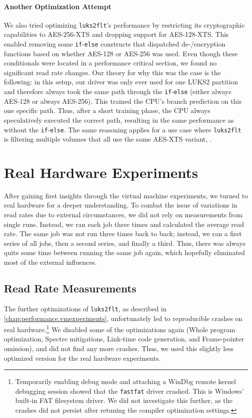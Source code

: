 \paragraph{Another Optimization Attempt}
We also tried optimizing \texttt{luks2flt}'s performance by restricting its cryptographic capabilities to AES-256-XTS and dropping support for AES-128-XTS. This enabled removing some \texttt{if}-\texttt{else} constructs that dispatched de-/encryption functions based on whether AES-128 or AES-256 was used. Even though these conditionals were located in a performance critical section, we found no significant read rate changes. Our theory for why this was the case is the following: in this setup, our driver was only ever used for one LUKS2 partition and therefore always took the same path through the \texttt{if}-\texttt{else} (either always AES-128 or always AES-256). This trained the CPU's branch prediction on this one specific path. Thus, after a short training phase, the CPU always speculatively executed the correct path, resulting in the same performance as without the \texttt{if}-\texttt{else}. The same reasoning applies for a use case where \texttt{luks2flt} is filtering multiple volumes that all use the same AES-XTS variant, .

\section{Real Hardware Experiments}
\label{chap:performance.hwexperiments}
After gaining first insights through the virtual machine experiments, we turned to real hardware for a deeper understanding. To combat the issue of variations in read rates due to external circumstances, we did not rely on measurements from single runs. Instead, we ran each job three times and calculated the average read rate. The same job was not run three times back to back; instead, we ran a first series of all jobs, then a second series, and finally a third. Thus, there was always quite some time between running the same job again, which hopefully eliminated most of the external influences.

\subsection{Read Rate Measurements}
\label{chap:performance.hwexperiments.encryptedseries2}
The further optimizations of \texttt{luks2flt}, as described in \autoref{chap:performance.vmexperiments}, unfortunately led to reproducible crashes on real hardware.\footnote{\label{fn:performance.hwexperiments.fastfatcrash} Temporarily enabling debug mode and attaching a WinDbg remote kernel debugging session showed that the \texttt{fastfat} driver crashed. This is Windows' built-in FAT filesystem driver. We did not investigate this further, as the crashes did not persist after retuning the compiler optimization settings.} We disabled some of the optimizations again (Whole program optimization, Spectre mitigations, Link-time code generation, and Frame-pointer omission), and did not find any more crashes. Thus, we used this slightly less optimized version for the real hardware experiments.

